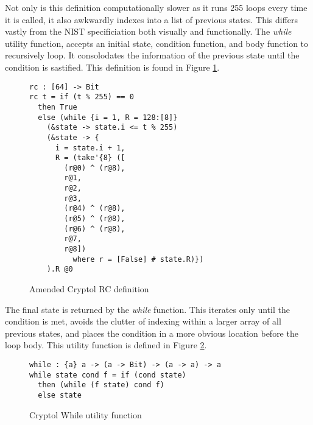 Not only is this definition computationally slower as it runs 255 loops every time it is called, it also awkwardly indexes into a list of previous states. 
This differs vastly from the NIST specificiation both visually and functionally. 
The \emph{while} utility function, accepts an initial state, condition function, and body function to recursively loop. 
It consolodates the information of the previous state until the condition is sastified. 
This definition is found in Figure \ref{fig:cryptolamendedRC}.

\begin{figure}[h]
  \centering
\begin{lstlisting}[language=Cryptol]
rc : [64] -> Bit
rc t = if (t % 255) == 0 
  then True 
  else (while {i = 1, R = 128:[8]}
    (&state -> state.i <= t % 255)
    (&state -> {
      i = state.i + 1, 
      R = (take'{8} ([
        (r@0) ^ (r@8),
        r@1,
        r@2,
        r@3,
        (r@4) ^ (r@8),
        (r@5) ^ (r@8),
        (r@6) ^ (r@8),
        r@7, 
        r@8]) 
          where r = [False] # state.R)})
    ).R @0
\end{lstlisting}
\caption{Amended Cryptol RC definition}
\label{fig:cryptolamendedRC}
\end{figure}

The final state is returned by the \emph{while} function. 
This iterates only until the condition is met, avoids the clutter of indexing within a larger array of all previous states, and places the condition in a more obvious location before the loop body. 
This utility function is defined in Figure \ref{fig:cryptolWhile}.

\begin{figure}[h]
  \centering
\begin{lstlisting}[language=Cryptol]
while : {a} a -> (a -> Bit) -> (a -> a) -> a
while state cond f = if (cond state)
  then (while (f state) cond f)	
  else state
\end{lstlisting}
\caption{Cryptol While utility function}
\label{fig:cryptolWhile}
\end{figure}